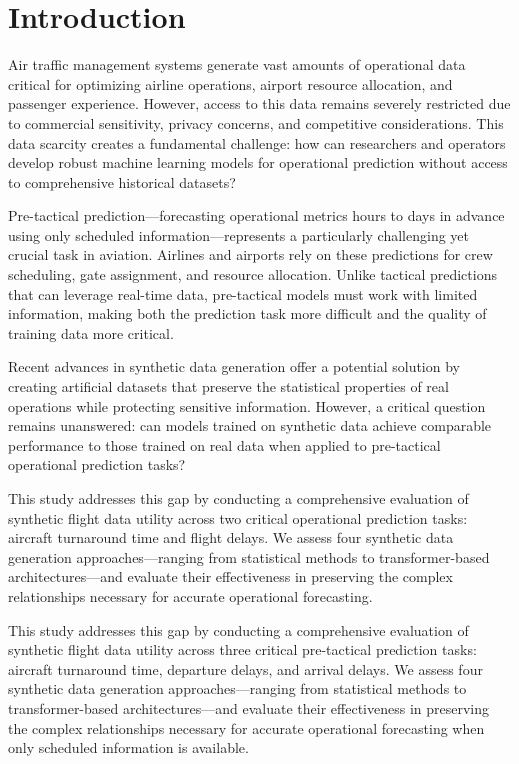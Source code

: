 \documentclass[conference]{IEEEtran}
\begin{document}
\section{Introduction}


Air traffic management systems generate vast amounts of operational data critical for optimizing airline operations, airport resource allocation, and passenger experience. However, access to this data remains severely restricted due to commercial sensitivity, privacy concerns, and competitive considerations. This data scarcity creates a fundamental challenge: how can researchers and operators develop robust machine learning models for operational prediction without access to comprehensive historical datasets?

Pre-tactical prediction—forecasting operational metrics hours to days in advance using only scheduled information—represents a particularly challenging yet crucial task in aviation. Airlines and airports rely on these predictions for crew scheduling, gate assignment, and resource allocation. Unlike tactical predictions that can leverage real-time data, pre-tactical models must work with limited information, making both the prediction task more difficult and the quality of training data more critical.


Recent advances in synthetic data generation offer a potential solution by creating artificial datasets that preserve the statistical properties of real operations while protecting sensitive information. However, a critical question remains unanswered: can models trained on synthetic data achieve comparable performance to those trained on real data when applied to pre-tactical operational prediction tasks?

This study addresses this gap by conducting a comprehensive evaluation of synthetic flight data utility across two critical operational prediction tasks: aircraft turnaround time and flight delays. We assess four synthetic data generation approaches—ranging from statistical methods to transformer-based architectures—and evaluate their effectiveness in preserving the complex relationships necessary for accurate operational forecasting.

This study addresses this gap by conducting a comprehensive evaluation of synthetic flight data utility across three critical pre-tactical prediction tasks: aircraft turnaround time, departure delays, and arrival delays. We assess four synthetic data generation approaches—ranging from statistical methods to transformer-based architectures—and evaluate their effectiveness in preserving the complex relationships necessary for accurate operational forecasting when only scheduled information is available.
\end{document}
